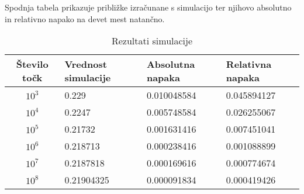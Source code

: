 \documentclass{amsart}
\theoremstyle{definition} %
\theoremstyle{plain} %
\begin{document}
Spodnja tabela prikazuje približke izračunane s simulacijo ter njihovo absolutno in relativno
napako na devet mest natančno.
\begin{table}[!ht]
    \caption{Rezultati simulacije}
    \begin{tabular}{|c|l|l|l|}
    \hline
    \textbf{Število točk} & \textbf{Vrednost simulacije} & \textbf{Absolutna napaka} & \textbf{Relativna napaka} \\ \hline
    $10^3$                & 0.229                        & 0.010048584               & 0.045894127               \\ \hline
    $10^4$                & 0.2247                       & 0.005748584               & 0.026255067               \\ \hline
    $10^5$                & 0.21732                      & 0.001631416               & 0.007451041               \\ \hline
    $10^6$                & 0.218713                     & 0.000238416               & 0.001088899               \\ \hline
    $10^7$                & 0.2187818                    & 0.000169616               & 0.000774674               \\ \hline
    $10^8$                & 0.21904325                   & 0.000091834               & 0.000419426               \\ \hline
    \end{tabular}
    \end{table}
\end{document}
